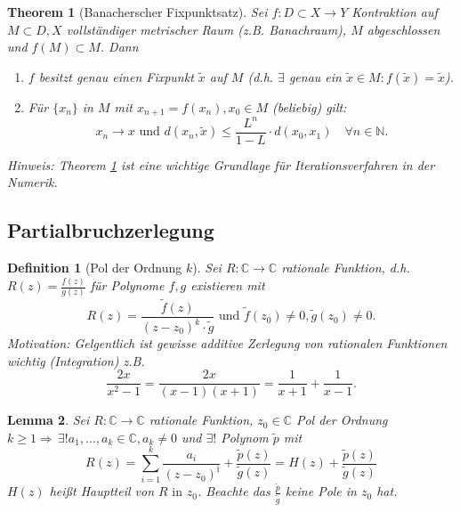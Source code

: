 \documentclass[ngerman,a4paper]{report}
\theoremstyle{break}
\newtheorem{theorem}{Theorem}[section]
\newtheorem{lemma}[theorem]{Lemma}
\newtheorem*{definition}{Definition}
\begin{document}
\begin{theorem}[Banacherscher Fixpunktsatz]\label{Banach_Fixpunkt}
    Sei $f : D\subset X \to Y$ Kontraktion auf $M \subset D, X$ vollständiger metrischer Raum (z.B. Banachraum), $M$ abgeschlossen und $f(M) \subset M$. Dann
    \begin{enumerate}
	    \item[(1)] $f$ besitzt genau einen Fixpunkt $\tilde{x}$ auf $M$ (d.h. $\exists$ genau ein $\tilde{x} \in M\colon f(\tilde{x}) = \tilde{x}$).
        \item[(2)] Für $\{x_n\}$ in $M$ mit $x_{n+1}=f(x_n),x_0 \in M$ (beliebig) gilt:
            \[
            x_n \to x \text{ und } d(x_n,\tilde{x}) \leq \frac{L^n}{1-L}\cdot d(x_0,x_1) \quad \forall n \in \mathbb{N}.
            \]
        \end{enumerate}
        Hinweis: Theorem \ref{Banach_Fixpunkt} ist eine wichtige Grundlage für Iterationsverfahren in der Numerik.
\end{theorem}

\subsection*{Partialbruchzerlegung}

\begin{definition}[Pol der Ordnung $k$]
    Sei $R: \mathbb{C} \to \mathbb{C}$ rationale Funktion, d.h. $R(z) = \frac{f(z)}{g(z)}$ für Polynome $f,g$ existieren mit
    \[
    R(z) = \frac{\tilde{f}(z)}{(z-z_0)^k\cdot \tilde{g}} \text{ und } \tilde{f}(z_0) \neq 0, \tilde{g}(z_0) \neq 0.
    \]
    Motivation: Gelgentlich ist gewisse additive Zerlegung von rationalen Funktionen wichtig (Integration) z.B.
    \[
    \frac{2x}{x^2 - 1} = \frac{2x}{(x-1)(x+1)} = \frac{1}{x+1}+\frac{1}{x-1}.
    \]
\end{definition}

\begin{lemma}
    Sei $R: \mathbb{C} \to \mathbb{C}$ rationale Funktion, $z_0 \in \mathbb{C}$ Pol der Ordnung $k\geq 1 \Rightarrow \,\exists ! a_1,\dots,a_k \in \mathbb{C},a_k\neq 0$ und $\exists !$ Polynom $\tilde{p}$ mit 
    \[
    R(z) = \sum_{i=1}^{k}
    \frac{a_i}{(z-z_0)^{î}} + \frac{\tilde{p}(z)}{\tilde{g}(z)} = H(z) +\frac{\tilde{p}(z)}{\tilde{g}(z)}
    \]
    $H(z)$ heißt Hauptteil von $R \text{ in } z_0$. Beachte das $\frac{\tilde{p}}{\tilde{g}}$ keine Pole in $z_0$ hat.
\end{lemma}
\end{document}
